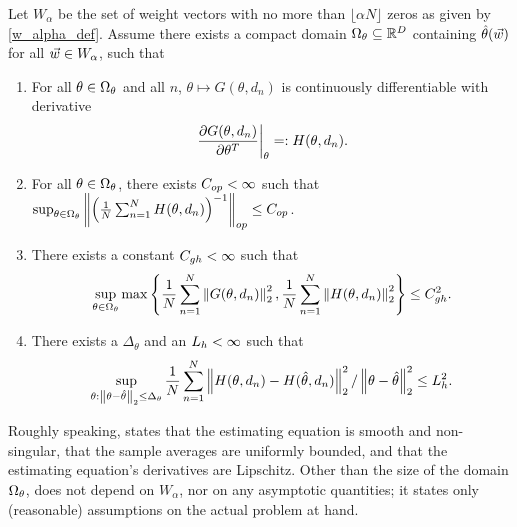 \begin{assu}
%
Let $W_\alpha$ be the set of weight vectors with no more than $\lfloor \alpha N
\rfloor$ zeros as given by \eqref{w_alpha_def}.   Assume there exists a compact
domain $\Omega_\theta \subseteq \mathbb{R}^D$ containing $\hat{\theta}(\vec{w})$ for all $\vec{w}
\in W_\alpha$, such that
%
\begin{enumerate}
    \item For all $\theta \in \Omega_\theta$ and all $n$, $\theta \mapsto G(\theta,
    d_n)$ is continuously differentiable with derivative
    \begin{align*}
    \left.\frac{\partial G(\theta, d_n)}{\partial \theta^T}\right|_{\theta}
    =: H(\theta, d_n).
    \end{align*}
    \sloppy \item For all $\theta \in \Omega_\theta$, there exists $C_{op} < \infty$
    such that
    $\sup_{\theta \in \Omega_\theta}\left\Vert \left( 
        \frac{1}{N}\sum_{n=1}^N H(\theta, d_n)\right)^{-1}
    \right\Vert_{op} \le C_{op}$.
    \sloppy \item There exists a constant $C_{gh} < \infty$ such that
    \begin{align*}
    \sup_{\theta \in \Omega_\theta}
        \max\left\{\frac{1}{N}\sum_{n=1}^N \left\Vert G(\theta, d_n)\right\Vert_2^2,
              \frac{1}{N}\sum_{n=1}^N \left\Vert H(\theta, d_n)\right\Vert_2^2 \right\} \le C_{gh}^2.
    \end{align*}
    \item There exists a $\Delta_\theta$ and an $L_{h} < \infty$ such that
    \begin{align*}
    \sup_{\theta: \left\Vert \theta - \hat{\theta}\right\Vert_2 \le \Delta_\theta}
    \frac{1}{N}\sum_{n=1}^N \left\Vert H(\theta, d_n) - H(\hat{\theta}, d_n)\right\Vert_2^2 /
         \left\Vert \theta - \hat{\theta}\right\Vert_2^2
    \le L_{h}^2.
    \end{align*}
\end{enumerate}
%
\end{assu}


Roughly speaking,  states that the estimating equation is
smooth and non-singular, that the sample averages are uniformly bounded, and
that the estimating equation's derivatives are Lipschitz.  Other than the size
of the domain $\Omega_\theta$,  does not depend on $W_\alpha$, nor
on any asymptotic quantities; it states only (reasonable) assumptions on the
actual problem at hand.

